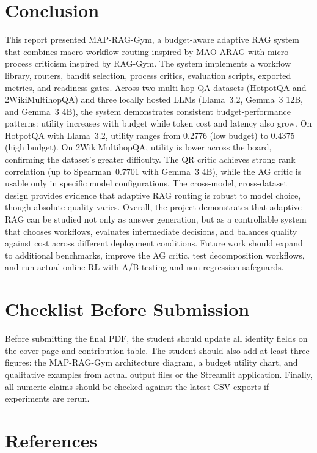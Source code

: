 \documentclass[12pt,a4paper]{article}
\begin{document}
\section{Conclusion}

This report presented MAP-RAG-Gym, a budget-aware adaptive RAG system that combines macro workflow routing inspired by MAO-ARAG with micro process criticism inspired by RAG-Gym. The system implements a workflow library, routers, bandit selection, process critics, evaluation scripts, exported metrics, and readiness gates. Across two multi-hop QA datasets (HotpotQA and 2WikiMultihopQA) and three locally hosted LLMs (Llama~3.2, Gemma~3 12B, and Gemma~3 4B), the system demonstrates consistent budget-performance patterns: utility increases with budget while token cost and latency also grow. On HotpotQA with Llama~3.2, utility ranges from 0.2776 (low budget) to 0.4375 (high budget). On 2WikiMultihopQA, utility is lower across the board, confirming the dataset's greater difficulty. The QR critic achieves strong rank correlation (up to Spearman~0.7701 with Gemma~3 4B), while the AG critic is usable only in specific model configurations. The cross-model, cross-dataset design provides evidence that adaptive RAG routing is robust to model choice, though absolute quality varies. Overall, the project demonstrates that adaptive RAG can be studied not only as answer generation, but as a controllable system that chooses workflows, evaluates intermediate decisions, and balances quality against cost across different deployment conditions. Future work should expand to additional benchmarks, improve the AG critic, test decomposition workflows, and run actual online RL with A/B testing and non-regression safeguards.

\section*{Checklist Before Submission}

Before submitting the final PDF, the student should update all identity fields on the cover page and contribution table. The student should also add at least three figures: the MAP-RAG-Gym architecture diagram, a budget utility chart, and qualitative examples from actual output files or the Streamlit application. Finally, all numeric claims should be checked against the latest CSV exports if experiments are rerun.

\section*{References}
\end{document}
